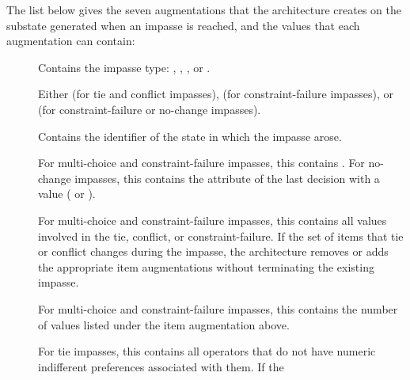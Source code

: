 The list below gives the seven augmentations that the architecture creates on the
substate generated when an impasse is reached, and the
values that each augmentation can contain:

\vspace{-12pt}
\begin{description} 
\item [] 
	\vspace{-8pt} 
\item [] Contains the impasse type: 
	, , , or .
	\vspace{-8pt} 
\item []Either  (for tie and conflict impasses), 
	 (for constraint-failure impasses), or 
	 (for constraint-failure or no-change impasses).
	\vspace{-8pt} 
\item [] Contains the identifier of the state in which 
	the impasse arose.
	\vspace{-8pt}
\item [] For multi-choice and constraint-failure impasses,
	this contains . For no-change impasses, this contains 
	the attribute of the last decision with a value ( or ).
	\vspace{-8pt}
\item [] For multi-choice and constraint-failure impasses, this 
	contains all values involved in the tie, conflict, or constraint-failure. 
	If the set of items that tie or conflict changes during the impasse, the architecture 
	removes or adds the appropriate item augmentations without terminating the existing impasse.
	\vspace{-8pt}
\item [] For multi-choice and constraint-failure impasses, this 
	contains the number of values listed under the item augmentation above.
	\vspace{-8pt}
\item [] For tie impasses, this contains all operators that
	do not have numeric indifferent preferences associated with them. If the

\end{description}
